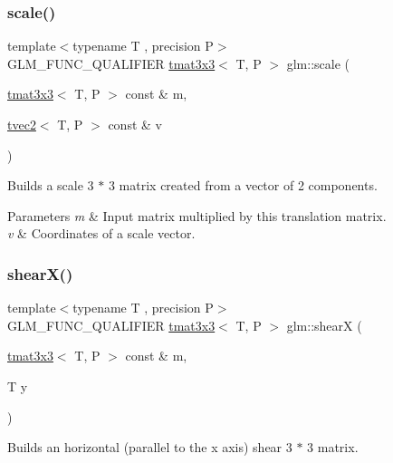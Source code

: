 \subsubsection{\texorpdfstring{scale()}{scale()}}
{\footnotesize\ttfamily template$<$typename T , precision P$>$ \\
G\+L\+M\+\_\+\+F\+U\+N\+C\+\_\+\+Q\+U\+A\+L\+I\+F\+I\+ER \hyperlink{structglm_1_1tmat3x3}{tmat3x3}$<$ T, P $>$ glm\+::scale (\begin{DoxyParamCaption}\item[{\hyperlink{structglm_1_1tmat3x3}{tmat3x3}$<$ T, P $>$ const \&}]{m,  }\item[{\hyperlink{structglm_1_1tvec2}{tvec2}$<$ T, P $>$ const \&}]{v }\end{DoxyParamCaption})}

Builds a scale 3 $\ast$ 3 matrix created from a vector of 2 components.


\begin{DoxyParams}{Parameters}
{\em m} & Input matrix multiplied by this translation matrix. \\
\hline
{\em v} & Coordinates of a scale vector. \\
\hline
\end{DoxyParams}
\mbox{\label{group__gtx__matrix__transform__2d_gab3363478cb625e40c5bd924fd838cf54}} 
\subsubsection{\texorpdfstring{shear\+X()}{shearX()}}
{\footnotesize\ttfamily template$<$typename T , precision P$>$ \\
G\+L\+M\+\_\+\+F\+U\+N\+C\+\_\+\+Q\+U\+A\+L\+I\+F\+I\+ER \hyperlink{structglm_1_1tmat3x3}{tmat3x3}$<$ T, P $>$ glm\+::shearX (\begin{DoxyParamCaption}\item[{\hyperlink{structglm_1_1tmat3x3}{tmat3x3}$<$ T, P $>$ const \&}]{m,  }\item[{T}]{y }\end{DoxyParamCaption})}

Builds an horizontal (parallel to the x axis) shear 3 $\ast$ 3 matrix.


